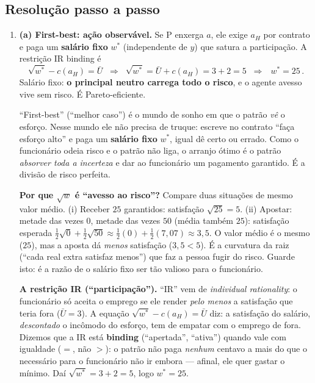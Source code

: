 \documentclass[11pt,a4paper]{article}
\begin{document}
\subsection*{Resolução passo a passo}
\begin{enumerate}[leftmargin=2em,itemsep=4pt]

\item \textbf{(a) First-best: ação observável.} Se P enxerga $a$, ele exige $a_H$ por
contrato e paga um \textbf{salário fixo} $w^\ast$ (independente de $y$) que satura a
participação. A restrição IR binding é
\[
\sqrt{w^\ast} - c(a_H) = \bar U
\;\;\Longrightarrow\;\; \sqrt{w^\ast} = \bar U + c(a_H) = 3 + 2 = 5
\;\;\Longrightarrow\;\; \boxed{\,w^\ast = 25\,}. \tag{2.1}
\]
Salário fixo: \textbf{o principal neutro carrega todo o risco}, e o agente avesso vive sem
risco. É Pareto-eficiente.

\begin{empalavras}
``First-best'' (``melhor caso'') é o mundo de sonho em que o patrão \emph{vê} o esforço.
Nesse mundo ele não precisa de truque: escreve no contrato ``faça esforço alto'' e paga um
\textbf{salário fixo} $w^\ast$, igual dê certo ou errado. Como o funcionário odeia risco e o
patrão não liga, o arranjo ótimo é o patrão \emph{absorver toda a incerteza} e dar ao
funcionário um pagamento garantido. É a divisão de risco perfeita.

\smallskip\noindent
\textbf{Por que $\sqrt{w}$ é ``avesso ao risco''?} Compare duas situações de mesmo valor
médio. (i) Receber $25$ garantidos: satisfação $\sqrt{25} = 5$. (ii) Apostar: metade das
vezes $0$, metade das vezes $50$ (média também $25$): satisfação esperada $\tfrac12\sqrt{0}
+ \tfrac12\sqrt{50} \approx \tfrac12(0) + \tfrac12(7{,}07) \approx 3{,}5$. O valor médio é o
mesmo ($25$), mas a aposta dá \emph{menos} satisfação ($3{,}5 < 5$). É a curvatura da raiz
(``cada real extra satisfaz menos'') que faz a pessoa fugir do risco. Guarde isto: é a razão
de o salário fixo ser tão valioso para o funcionário.

\smallskip\noindent
\textbf{A restrição IR (``participação'').} ``IR'' vem de \emph{individual rationality}:
o funcionário só aceita o emprego se ele render \emph{pelo menos} a satisfação que teria
fora ($\bar U = 3$). A equação $\sqrt{w^\ast} - c(a_H) = \bar U$ diz: a satisfação do
salário, \emph{descontado} o incômodo do esforço, tem de empatar com o emprego de fora.
Dizemos que a IR está \textbf{binding} (``apertada'', ``ativa'') quando vale com igualdade
($=$, não $>$): o patrão não paga \emph{nenhum} centavo a mais do que o necessário para o
funcionário não ir embora — afinal, ele quer gastar o mínimo. Daí $\sqrt{w^\ast} = 3 + 2 =
5$, logo $w^\ast = 25$.
\end{empalavras}


\end{enumerate}
\end{document}
